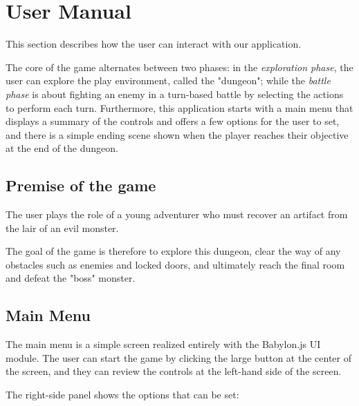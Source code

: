 
{
\let\clearpage\relax

\chapter{User Manual}
}

This section describes how the user can interact with our application.

The core of the game alternates between two phases: in the \textit{exploration phase}, the user can explore the play environment, called the "dungeon"; while the \textit{battle phase} is about fighting an enemy in a turn-based battle by selecting the actions to perform each turn. Furthermore, this application starts with a main menu that displays a summary of the controls and offers a few options for the user to set, and there is a simple ending scene shown when the player reaches their objective at the end of the dungeon.

\section{Premise of the game}

The user plays the role of a young adventurer who must recover an artifact from the lair of an evil monster.

The goal of the game is therefore to explore this dungeon, clear the way of any obstacles such as enemies and locked doors, and ultimately reach the final room and defeat the "boss" monster.

\section{Main Menu}

The main menu is a simple screen realized entirely with the Babylon.js UI module. The user can start the game by clicking the large button at the center of the screen, and they can review the controls at the left-hand side of the screen.

The right-side panel shows the options that can be set:

